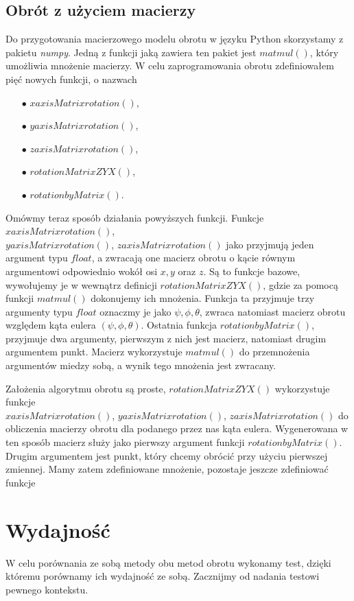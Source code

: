 \documentclass[a4paper,twoside,11pt,reqno]{mwrep}
\theoremstyle{plain} \newtheorem{twr}{Twierdzenie}
\theoremstyle{plain} \newtheorem{lem}{Lemat}
\theoremstyle{definition} \newtheorem{defi}{Definicja}
\theoremstyle{remark} \newtheorem*{wni}{Wniosek}
\theoremstyle{definition} \newtheorem{uwaga}{Uwaga}
\theoremstyle{definition}\newtheorem{prz}{Przykład}
\begin{document}
\subsection{Obrót z użyciem macierzy}
Do przygotowania macierzowego modelu obrotu w języku Python skorzystamy z pakietu \textit{numpy}. 
Jedną z funkcji jaką zawiera ten pakiet jest $matmul()$, który umożliwia mnożenie macierzy. 
W celu zaprogramowania obrotu zdefiniowałem pięć nowych funkcji, o nazwach
\begin{itemize}
\item[$\bullet$] $xaxisMatrixrotation()$,
\item[$\bullet$] $yaxisMatrixrotation()$,
\item[$\bullet$] $zaxisMatrixrotation()$,
\item[$\bullet$] $rotationMatrixZYX()$,
\item[$\bullet$] $rotationbyMatrix()$.
\end{itemize} 
Omówmy teraz sposób działania powyższych funkcji. Funkcje $xaxisMatrixrotation()$,\\
$yaxisMatrixrotation()$,
$zaxisMatrixrotation()$ jako przyjmują jeden argument typu $float$, a zwracają one macierz obrotu o kącie równym
argumentowi odpowiednio wokół osi $x,y$ oraz $z$. Są to funkcje bazowe, wywołujemy je w wewnątrz definicji
$rotationMatrixZYX()$, gdzie za pomocą funkcji $matmul()$ dokonujemy ich mnożenia. Funkcja ta przyjmuje trzy argumenty
typu $float$ oznaczmy je jako $\psi,\phi,\theta$, zwraca natomiast macierz obrotu względem kąta eulera $(\psi,\phi,\theta)$.
Ostatnia funkcja $rotationbyMatrix()$, przyjmuje dwa argumenty, pierwszym z nich jest macierz, natomiast drugim argumentem 
punkt. Macierz wykorzystuje $matmul()$ do przemnożenia argumentów miedzy sobą, a wynik tego mnożenia jest zwracany.

Założenia algorytmu obrotu są proste, $rotationMatrixZYX()$ wykorzystuje funkcje\\
$xaxisMatrixrotation()$, $yaxisMatrixrotation()$, $zaxisMatrixrotation()$ do obliczenia 
macierzy obrotu dla podanego przez nas kąta eulera. Wygenerowana w ten sposób macierz służy jako
pierwszy argument
funkcji $rotationbyMatrix()$. Drugim argumentem jest punkt, który chcemy obrócić przy użyciu
pierwszej zmiennej.  
Mamy zatem zdefiniowane mnożenie, pozostaje jeszcze zdefiniować funkcje 
\section{Wydajność}
W celu porównania ze sobą metody obu metod obrotu wykonamy test, dzięki któremu porównamy ich wydajność ze sobą. Zacznijmy od nadania testowi pewnego kontekstu.
\end{document}
